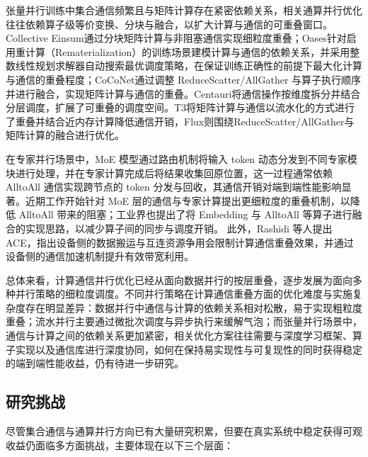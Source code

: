 张量并行训练中集合通信频繁且与矩阵计算存在紧密依赖关系，相关通算并行优化往往依赖算子级等价变换、分块与融合，以扩大计算与通信的可重叠窗口。Collective Einsum\cite{wang2022overlap}通过分块矩阵计算与非阻塞通信实现细粒度重叠；Oases\cite{li2023automated}针对启用重计算（Rematerialization）的训练场景建模计算与通信的依赖关系，并采用整数线性规划求解器自动搜索最优调度策略，在保证训练正确性的前提下最大化计算与通信的重叠程度；CoCoNet\cite{jangda2022breaking}通过调整 ReduceScatter/AllGather 与算子执行顺序并进行融合，实现矩阵计算与通信的重叠。Centauri\cite{chen2024centauri}将通信操作按维度拆分并结合分层调度，扩展了可重叠的调度空间。T3\cite{pati2024t3}将矩阵计算与通信以流水化的方式进行了重叠并结合近内存计算降低通信开销，Flux\cite{chang2024flux}则围绕ReduceScatter/AllGather与矩阵计算的融合进行优化。

在专家并行场景中，MoE 模型通过路由机制将输入 token 动态分发到不同专家模块进行处理，并在专家计算完成后将结果收集回原位置，这一过程通常依赖 AlltoAll 通信实现跨节点的 token 分发与回收，其通信开销对端到端性能影响显著。近期工作开始针对 MoE 层的通信与专家计算提出更细粒度的重叠机制，以降低 AlltoAll 带来的阻塞\cite{zhang2025comet}；工业界也提出了将 Embedding 与 AlltoAll 等算子进行融合的实现思路，以减少算子间的同步与调度开销\cite{punniyamurthy2024optimizing}。
此外，Rashidi 等人\cite{rashidi2021enabling}提出 ACE，指出设备侧的数据搬运与互连资源争用会限制计算通信重叠效果，并通过设备侧的通信加速机制提升有效带宽利用。

总体来看，计算通信并行优化已经从面向数据并行的按层重叠，逐步发展为面向多种并行策略的细粒度调度。不同并行策略在计算通信重叠方面的优化难度与实施复杂度存在明显差异：数据并行中通信与计算的依赖关系相对松散，易于实现粗粒度重叠；流水并行主要通过微批次调度与异步执行来缓解气泡；而张量并行场景中，通信与计算之间的依赖关系更加紧密，相关优化方案往往需要与深度学习框架、算子实现以及通信库进行深度协同，如何在保持易实现性与可复现性的同时获得稳定的端到端性能收益，仍有待进一步研究。



\subsection{研究挑战}

尽管集合通信与通算并行方向已有大量研究积累，但要在真实系统中稳定获得可观收益仍面临多方面挑战，主要体现在以下三个层面：

